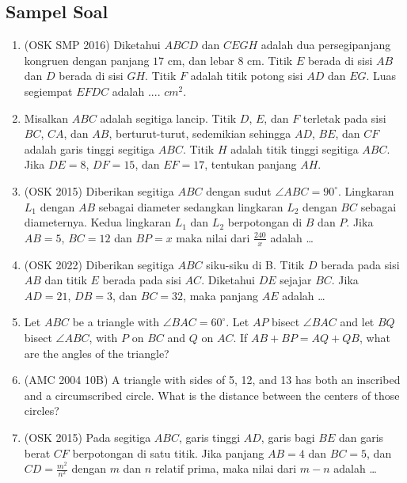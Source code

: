 \documentclass[11pt]{scrartcl}
\begin{document}
\subsection{Sampel Soal}
\begin{enumerate}
    \item (OSK SMP 2016) Diketahui $ABCD$ dan $CEGH$ adalah dua persegipanjang kongruen dengan panjang $17$ cm, dan lebar $8$ cm. Titik $E$ berada di sisi $AB$ dan $D$ berada di sisi $GH$. Titik $F$ adalah titik potong sisi $AD$ dan $EG$. Luas segiempat $EFDC$ adalah .... $cm^2$.

    \item Misalkan $ABC$ adalah segitiga lancip. Titik $D$, $E$, dan $F$ terletak pada sisi $BC$, $CA$, dan $AB$, berturut-turut, sedemikian sehingga $AD$, $BE$, dan $CF$ adalah garis tinggi segitiga $ABC$. Titik $H$ adalah titik tinggi segitiga $ABC$. Jika $DE = 8$, $DF = 15$, dan $EF = 17$, tentukan panjang $AH$.

    \item (OSK 2015) Diberikan segitiga $ABC$ dengan sudut $\angle ABC = 90^\circ$. Lingkaran $L_1$ dengan $AB$ sebagai diameter sedangkan lingkaran $L_2$ dengan $BC$ sebagai diameternya. Kedua lingkaran $L_1$ dan $L_2$ berpotongan di $B$ dan $P$. Jika $AB = 5$, $BC = 12$ dan $BP = x$ maka nilai dari $\frac{240}{x}$ adalah \ldots

    \item (OSK 2022) Diberikan segitiga $ABC$ siku-siku di B. Titik $D$ berada pada sisi $AB$ dan titik $E$ berada pada sisi $AC$. Diketahui $DE$ sejajar $BC$. Jika $AD = 21$, $DB = 3$, dan $BC = 32$, maka panjang $AE$ adalah \dots
    
    \item Let $ABC$ be a triangle with $\angle BAC = 60^\circ$. Let $AP$ bisect $\angle BAC$ and let $BQ$ bisect $\angle ABC$, with $P$ on $BC$ and $Q$ on $AC$. If $AB + BP = AQ + QB$, what are the angles of the triangle?

    \item (AMC 2004 10B) A triangle with sides of 5, 12, and 13 has both an inscribed and a circumscribed circle. What is the distance between the centers of those circles?

    \item (OSK 2015) Pada segitiga $ABC$, garis tinggi $AD$, garis bagi $BE$ dan garis berat $CF$ berpotongan di satu titik. Jika panjang $AB = 4$ dan $BC = 5$, dan $CD = \frac{m^2}{n^2}$ dengan $m$ dan $n$ relatif prima, maka nilai dari $m - n$ adalah \ldots


\end{enumerate}
\end{document}
